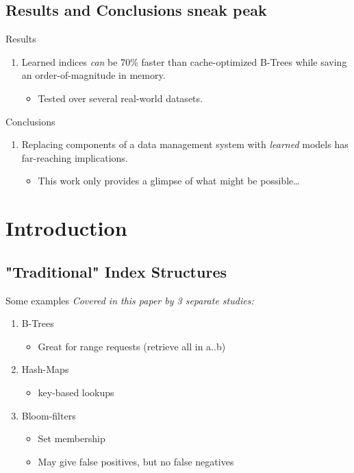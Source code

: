 \documentclass[presentation]{beamer}
\begin{document}
\subsection{Results and Conclusions sneak peak}
\label{sec:org2e08403}
\begin{frame}[label={sec:org9a04ddc}]{Results}
\begin{enumerate}
\item \alert{Learned} indices \emph{can} be 70\% \alert{faster} than cache-optimized B-Trees while \alert{saving} an order-of-magnitude in \alert{memory}.

\begin{itemize}
\item Tested over several real-world datasets.
\end{itemize}
\end{enumerate}
\end{frame}

\begin{frame}[label={sec:org070d909}]{Conclusions}
\begin{enumerate}
\item \alert{Replacing components} of a data management system with \emph{\alert{learned}} models has \alert{far-reaching} implications.

\begin{itemize}
\item This work only provides a \alert{glimpse} of what might be possible\ldots{}
\end{itemize}
\end{enumerate}
\end{frame}

\section{Introduction}
\label{sec:org6795beb}
\subsection{"Traditional" Index Structures}
\label{sec:orgbae0c8e}
\begin{frame}[label={sec:org8b27bce}]{Some examples}
\emph{Covered in this paper by 3 separate studies:}
\begin{enumerate}
\item B-Trees
\begin{itemize}
\item Great for \alert{range} requests (retrieve all in a..b)
\end{itemize}
\item Hash-Maps
\begin{itemize}
\item \alert{key}-based lookups
\end{itemize}
\item Bloom-filters
\begin{itemize}
\item Set membership
\item May give false positives, but no false negatives
\end{itemize}
\end{enumerate}
\end{frame}
\end{document}
